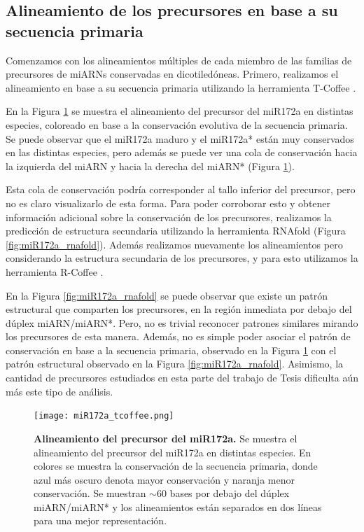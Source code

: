\subsection{Alineamiento de los precursores en base a su secuencia primaria}

Comenzamos con los alineamientos múltiples de cada miembro de las familias de precursores de miARNs conservadas en dicotiledóneas.
Primero, realizamos el alineamiento en base a su secuencia primaria utilizando la herramienta T-Coffee \citep{pmid10964570}.

En la Figura \ref{fig:miR172a_tcoffee} se muestra el alineamiento del precursor del miR172a en distintas especies, coloreado en base a la conservación evolutiva de la secuencia primaria.
Se puede observar que el miR172a maduro y el miR172a* están muy conservados en las distintas especies, pero además se puede ver una cola de conservación hacia la izquierda del miARN y hacia la derecha del miARN* (Figura \ref{fig:miR172a_tcoffee}).

Esta cola de conservación podría corresponder al tallo inferior del precursor, pero no es claro visualizarlo de esta forma.
Para poder corroborar esto y obtener información adicional sobre la conservación de los precursores, realizamos la predicción de estructura secundaria utilizando la herramienta RNAfold \citep{pmid22115189} (Figura \ref{fig:miR172a_rnafold}).
Además realizamos nuevamente los alineamientos pero considerando la estructura secundaria de los precursores, y para esto utilizamos la herramienta R-Coffee \citep{pmid18292307}.

En la Figura \ref{fig:miR172a_rnafold} se puede observar que existe un patrón estructural que comparten los precursores, en la región inmediata por debajo del dúplex miARN/miARN*.
Pero, no es trivial reconocer patrones similares mirando los precursores de esta manera.
Además, no es simple poder asociar el patrón de conservación en base a la secuencia primaria, observado en la Figura \ref{fig:miR172a_tcoffee} con el patrón estructural observado en la Figura \ref{fig:miR172a_rnafold}.
Asimismo, la cantidad de precursores estudiados en esta parte del trabajo de Tesis dificulta aún más este tipo de análisis.

\begin{landscape}
    \begin{figure}[htbp!] 
        \centering    
        \texttt{[image: miR172a\_tcoffee.png]}
        \caption[Alineamiento del precursor del miR172a.]{
        \textbf{Alineamiento del precursor del miR172a.}
        Se muestra el alineamiento del precursor del miR172a en distintas especies. 
        En colores se muestra la conservación de la secuencia primaria, donde azul más oscuro denota mayor conservación y naranja menor conservación.
        Se muestran $\sim$60 bases por debajo del dúplex miARN/miARN* y los alineamientos están separados en dos líneas para una mejor representación.}
         \label{fig:miR172a_tcoffee}
    \end{figure}
\end{landscape}

